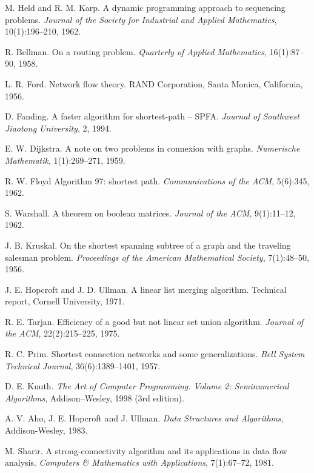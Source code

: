 \begin{thebibliography}{9}
    M. Held and R. M. Karp.
    A dynamic programming approach to sequencing problems.
    \emph{Journal of the Society for Industrial and Applied Mathematics}, 10(1):196--210, 1962.
  
    R. Bellman.
    On a routing problem.
    \emph{Quarterly of Applied Mathematics}, 16(1):87--90, 1958.
  
    L. R. Ford.
    Network flow theory.
    RAND Corporation, Santa Monica, California, 1956.
  
    D. Fanding.
    A faster algorithm for shortest-path -- SPFA.
    \emph{Journal of Southwest Jiaotong University}, 2, 1994.
  
    E. W. Dijkstra.
    A note on two problems in connexion with graphs.
    \emph{Numerische Mathematik}, 1(1):269--271, 1959.
  
  
    R. W. Floyd
    Algorithm 97: shortest path.
    \emph{Communications of the ACM}, 5(6):345, 1962.
  
    S. Warshall.
    A theorem on boolean matrices.
    \emph{Journal of the ACM}, 9(1):11--12, 1962.
  
    J. B. Kruskal.
    On the shortest spanning subtree of a graph and the traveling salesman problem.
    \emph{Proceedings of the American Mathematical Society}, 7(1):48--50, 1956.
  
    J. E. Hopcroft and J. D. Ullman.
    A linear list merging algorithm.
    Technical report, Cornell University, 1971.
  
    R. E. Tarjan.
    Efficiency of a good but not linear set union algorithm.
    \emph{Journal of the ACM}, 22(2):215--225, 1975.
  
    R. C. Prim.
    Shortest connection networks and some generalizations.
    \emph{Bell System Technical Journal}, 36(6):1389--1401, 1957.
  
    D. E. Knuth.
    \emph{The Art of Computer Programming. Volume 2: Seminumerical Algorithms}, Addison–Wesley, 1998 (3rd edition).
  
    A. V. Aho, J. E. Hopcroft and J. Ullman.
    \emph{Data Structures and Algorithms},
    Addison-Wesley, 1983.
  
    M. Sharir.
    A strong-connectivity algorithm and its applications in data flow analysis.
    \emph{Computers \& Mathematics with Applications}, 7(1):67--72, 1981.
  

\end{thebibliography}

